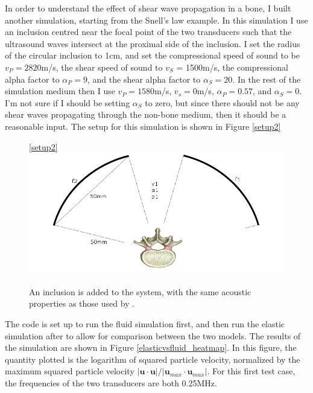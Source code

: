 \documentclass[10pt,a4paper]{article}
\begin{document}
In order to understand the effect of shear wave propagation in a bone, I built another simulation, starting from the Snell's law example. In this simulation I use an inclusion centred near the focal point of the two transducers such that the ultrasound waves intersect at the proximal side of the inclusion. I set the radius of the circular inclusion to 1cm, and set the compressional speed of sound to be $v_P = 2820$m/s, the shear speed of sound to $v_S$ = 1500m/s, the compressional alpha factor to $\alpha_P = 9$, and the shear alpha factor to $\alpha_S = 20$. In the rest of the simulation medium then I use $v_P = 1580$m/s, $v_s = 0$m/s, $\alpha_P = 0.57$, and $\alpha_S = 0$. I'm not sure if I should be setting $\alpha_S$ to zero, but since there should not be any shear waves propagating through the non-bone medium, then it should be a reasonable input. The setup for this simulation is shown in Figure \ref{setup2}
\begin{figure}[H] \ref{setup2}
\centering
\includegraphics[scale=0.5]{setup2}
\caption{An inclusion is added to the system, with the same acoustic properties as those used by \cite{treeby2015contribution}.}
\end{figure}

The code is set up to run the fluid simulation first, and then run the elastic simulation after to allow for comparison between the two models. The results of the simulation are shown in Figure \ref{elasticvsfluid_heatmap}. In this figure, the quantity plotted is the logarithm of squared particle velocity, normalized by the maximum squared particle velocity $\vert \textbf{u} \cdot \textbf{u} \vert / \vert  \textbf{u}_{max} \cdot \textbf{u}_{max}\vert $. For this first test case, the frequencies of the two transducers are both 0.25MHz. 
\end{document}
